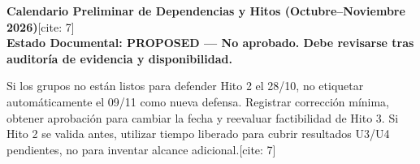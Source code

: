 \documentclass[10pt, a4paper, landscape]{article}
\begin{document}
\begin{center}
    {\Large\textbf{\textcolor{ucbblue}{Calendario Preliminar de Dependencias y Hitos (Octubre--Noviembre 2026)}}}[cite: 7] \\[0.1cm]
    {\footnotesize\textbf{Estado Documental: PROPOSED — No aprobado. Debe revisarse tras auditoría de evidencia y disponibilidad.}}
\end{center}

\begin{tcolorbox}[colback=white, colframe=black, boxsep=1pt, top=2pt, bottom=2pt, title=\textbf{Regla de Bifurcación (Branch Rule)}]
    \footnotesize\raggedright
    Si los grupos no están listos para defender Hito 2 el 28/10, no etiquetar automáticamente el 09/11 como nueva defensa. Registrar corrección mínima, obtener aprobación para cambiar la fecha y reevaluar factibilidad de Hito 3. Si Hito 2 se valida antes, utilizar tiempo liberado para cubrir resultados U3/U4 pendientes, no para inventar alcance adicional.[cite: 7]
\end{tcolorbox}
\end{document}
